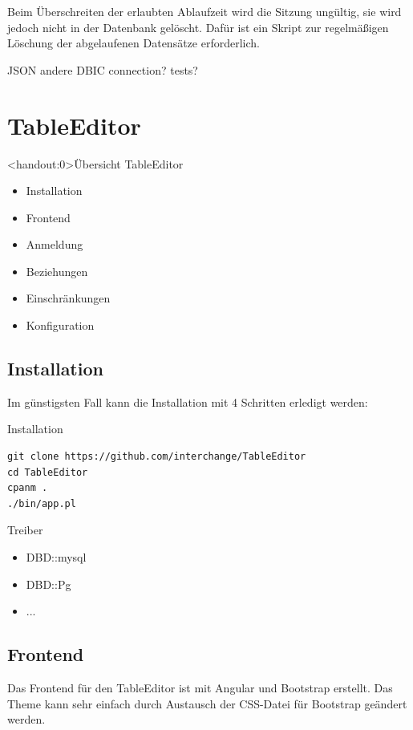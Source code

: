 Beim Überschreiten der erlaubten Ablaufzeit wird die Sitzung
ungültig, sie wird jedoch nicht in der Datenbank gelöscht.
Dafür ist ein Skript zur regelmäßigen Löschung der
abgelaufenen Datensätze erforderlich.

JSON
andere DBIC connection?
tests?

\section{TableEditor}

\begin{frame}<handout:0>{Übersicht TableEditor}
\begin{itemize}
\item Installation
\item Frontend
\item Anmeldung
\item Beziehungen
\item Einschränkungen
\item Konfiguration
\end{itemize}
\end{frame}

\subsection{Installation}
Im günstigsten Fall kann die Installation mit 4 Schritten
erledigt werden:

\begin{frame}[fragile]{Installation}
\begin{lstlisting}
git clone https://github.com/interchange/TableEditor
cd TableEditor
cpanm .
./bin/app.pl
\end{lstlisting}
\end{frame}

\begin{frame}[fragile]{Treiber}
\begin{itemize}
\item DBD::mysql
\item DBD::Pg
\item ...
\end{itemize}
\end{frame}

\subsection{Frontend}
Das Frontend für den TableEditor ist mit Angular und Bootstrap erstellt.
Das Theme kann sehr einfach durch Austausch der CSS-Datei für Bootstrap
geändert werden.

